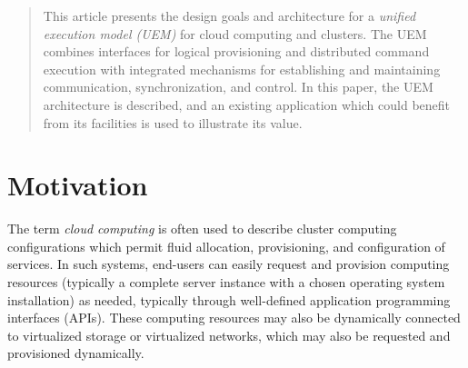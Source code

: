 \documentclass{sig-alternate}
\begin{document}



\maketitle

\begin{abstract}
This article presents the design goals and architecture for a 
{\it unified execution model (UEM)} for cloud computing and clusters. 
The UEM combines interfaces for logical provisioning and distributed command 
execution with integrated mechanisms for establishing and maintaining communication, 
synchronization, and control.
In this paper, the UEM architecture is described, and an existing application 
which could benefit from its facilities is used to illustrate its value.
\end{abstract}


\section{Motivation}
The term {\it cloud computing} is often used to describe cluster computing
configurations which permit fluid allocation,
provisioning, and configuration of services.  In such systems, end-users
can easily request and provision computing resources (typically a complete server instance with a chosen operating system installation) as needed, typically
through well-defined application programming interfaces (APIs). These computing
resources may also be dynamically connected to
virtualized storage or virtualized networks, which may also be requested and provisioned 
dynamically.	
\end{document}
